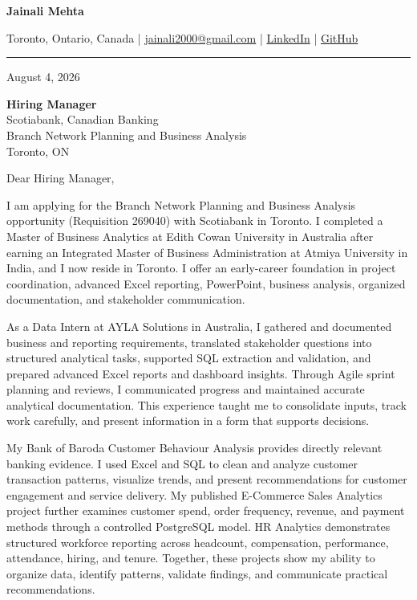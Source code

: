 \documentclass[letterpaper,10pt]{article}
\begin{document}
\begin{center}
  {\fontsize{17}{19}\selectfont\textbf{Jainali Mehta}}\par\vspace{2pt}
  \small Toronto, Ontario, Canada \;|\;
  \href{mailto:jainali2000@gmail.com}{jainali2000@gmail.com} \;|\;
  \href{https://www.linkedin.com/in/jainali-mehta}{LinkedIn} \;|\;
  \href{https://github.com/jainalimehta}{GitHub}
\end{center}
\vspace{-5pt}
\noindent\rule{\textwidth}{0.4pt}

August 4, 2026

\textbf{Hiring Manager}\\
Scotiabank, Canadian Banking\\
Branch Network Planning and Business Analysis\\
Toronto, ON

Dear Hiring Manager,

I am applying for the Branch Network Planning and Business Analysis opportunity (Requisition 269040) with Scotiabank in Toronto. I completed a Master of Business Analytics at Edith Cowan University in Australia after earning an Integrated Master of Business Administration at Atmiya University in India, and I now reside in Toronto. I offer an early-career foundation in project coordination, advanced Excel reporting, PowerPoint, business analysis, organized documentation, and stakeholder communication.

As a Data Intern at AYLA Solutions in Australia, I gathered and documented business and reporting requirements, translated stakeholder questions into structured analytical tasks, supported SQL extraction and validation, and prepared advanced Excel reports and dashboard insights. Through Agile sprint planning and reviews, I communicated progress and maintained accurate analytical documentation. This experience taught me to consolidate inputs, track work carefully, and present information in a form that supports decisions.

My Bank of Baroda Customer Behaviour Analysis provides directly relevant banking evidence. I used Excel and SQL to clean and analyze customer transaction patterns, visualize trends, and present recommendations for customer engagement and service delivery. My published E-Commerce Sales Analytics project further examines customer spend, order frequency, revenue, and payment methods through a controlled PostgreSQL model. HR Analytics demonstrates structured workforce reporting across headcount, compensation, performance, attendance, hiring, and tenure. Together, these projects show my ability to organize data, identify patterns, validate findings, and communicate practical recommendations.
\end{document}
